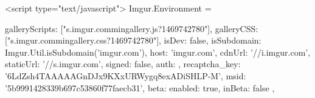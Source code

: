         <script type="text/javascript">
            Imgur.Environment = {
                galleryScripts:             ["\/\/s.imgur.com\/min\/gallery.js?1469742780"],
                galleryCSS:                 ["\/\/s.imgur.com\/min\/gallery.css?1469742780"],
                isDev:                      false,
                isSubdomain:                Imgur.Util.isSubdomain('imgur.com'),
                host:                       'imgur.com',
                cdnUrl:                     '//i.imgur.com',
                staticUrl:                  '//s.imgur.com',
                signed:                     false,
                auth:                       {},
                recaptcha_key:              '6LdZsh4TAAAAAGnDJx9KXxURWygq8exADiSHLP-M',
                msid:                       '5b9991428339b697c53860f77faecb31',
                beta:                       {
                    enabled: true,
                    inBeta:  false
                },
                
}
